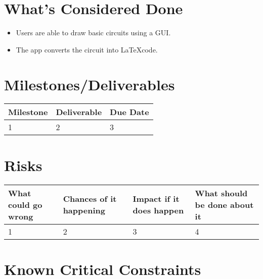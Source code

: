 \section*{What's Considered Done}
\begin{itemize}
    \item Users are able to draw basic circuits using a GUI.
    \item The app converts the circuit into \LaTeX code.
\end{itemize}

\section*{Milestones/Deliverables}
\begin{center}
    \begin{tabular}{|l|l|l|}
        \hline
        Milestone & Deliverable & Due Date \\
        \hline
        1 & 2 & 3 \\
        \hline
    \end{tabular}
\end{center}

\section*{Risks}
\begin{tabular}{|l|l|l|l|}
    \hline
    What could go wrong & Chances of it happening & Impact if it does happen & What should be done about it \\
    \hline
    1 & 2 & 3 & 4\\
    \hline
\end{tabular}

\section*{Known Critical Constraints}